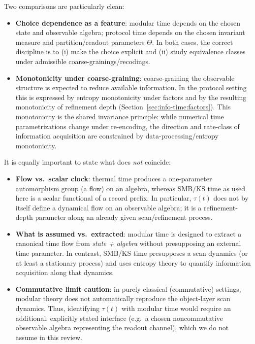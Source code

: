 Two comparisons are particularly clean:
\begin{itemize}[leftmargin=*,itemsep=2pt]
  \item \textbf{Choice dependence as a feature}: modular time depends on the chosen state and observable algebra; protocol time depends on the chosen invariant measure and partition/readout parameters $\Theta$. In both cases, the correct discipline is to (i) make the choice explicit and (ii) study equivalence classes under admissible coarse-grainings/recodings.
  \item \textbf{Monotonicity under coarse-graining}: coarse-graining the observable structure is expected to reduce available information. In the protocol setting this is expressed by entropy monotonicity under factors and by the resulting monotonicity of refinement depth (Section~\ref{sec:info-time:factors}). This monotonicity is the shared invariance principle: while numerical time parametrizations change under re-encoding, the direction and rate-class of information acquisition are constrained by data-processing/entropy monotonicity.
\end{itemize}

It is equally important to state what does \emph{not} coincide:
\begin{itemize}[leftmargin=*,itemsep=2pt]
  \item \textbf{Flow vs.\ scalar clock}: thermal time produces a one-parameter automorphism group (a flow) on an algebra, whereas SMB/KS time as used here is a scalar functional of a record prefix. In particular, $\tau(t)$ does not by itself define a dynamical flow on an observable algebra; it is a refinement-depth parameter along an already given scan/refinement process.
  \item \textbf{What is assumed vs.\ extracted}: modular time is designed to extract a canonical time flow from \emph{state + algebra} without presupposing an external time parameter. In contrast, SMB/KS time presupposes a scan dynamics (or at least a stationary process) and uses entropy theory to quantify information acquisition along that dynamics.
  \item \textbf{Commutative limit caution}: in purely classical (commutative) settings, modular theory does not automatically reproduce the object-layer scan dynamics. Thus, identifying $\tau(t)$ with modular time would require an additional, explicitly stated interface (e.g.\ a chosen noncommutative observable algebra representing the readout channel), which we do not assume in this review.
\end{itemize}

